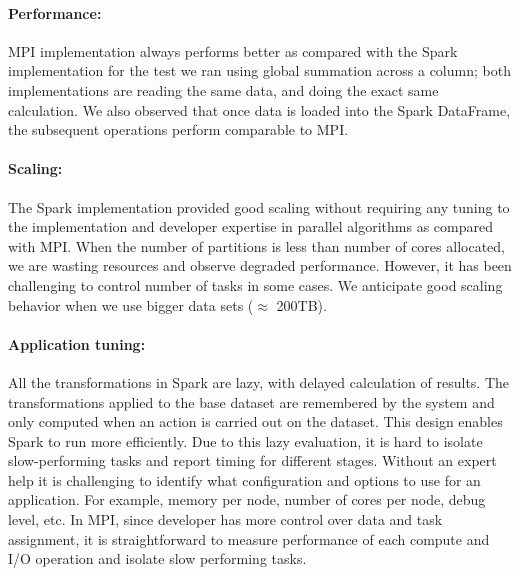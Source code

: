\documentclass[10pt, twocolumn]{article}
\newcommand{\squeezeup}{\vspace{-5.5mm}}
\begin{document}
 \squeezeup
\paragraph{Performance: } 
MPI implementation always performs better as compared with the Spark 
implementation for the test we ran using global summation across a column; 
both implementations are reading the same data, and doing the exact same calculation. 
We also observed that once data is loaded into the Spark DataFrame, 
the subsequent operations perform comparable to MPI. 
 \squeezeup
\paragraph{Scaling: }
The Spark implementation provided good
  scaling without requiring any tuning to the implementation and
  developer expertise in parallel algorithms as compared with MPI. 
  When the number of partitions is less than number of cores allocated, 
we are wasting resources and observe degraded performance. 
However, it has been challenging to control number of tasks in some cases. 
We anticipate good scaling behavior when we use bigger data sets ($\approx$ 200TB). 

\squeezeup
  \paragraph{Application tuning: } All the transformations in Spark
  are lazy, with delayed calculation of results. The transformations
  applied to the base dataset are remembered by the system
  and only computed when an action is carried out on the dataset.
  This design enables Spark to run more efficiently. 
  Due to this lazy evaluation, it is hard to isolate slow-performing tasks and report
  timing for different stages. 
  Without an expert help 
it is challenging to identify what configuration and options to use for 
an application. 
For example, memory per node, number of cores per node,
debug level, etc.  
  In MPI, since developer has more control over data and task assignment, it is 
  straightforward to measure performance of each compute and I/O operation and 
  isolate slow performing tasks.   
\squeezeup
\end{document}
